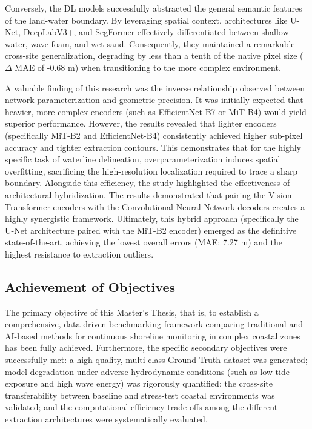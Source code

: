 ﻿\documentclass[ENG]{TFUOC}%
\begin{document}
Conversely, the DL models successfully abstracted the general semantic features of the land-water boundary. By leveraging spatial context, architectures like U-Net, DeepLabV3+, and SegFormer effectively differentiated between shallow water, wave foam, and wet sand. Consequently, they maintained a remarkable cross-site generalization, degrading by less than a tenth of the native pixel size ($\Delta$ MAE of -0.68 m) when transitioning to the more complex environment. 

A valuable finding of this research was the inverse relationship observed between network parameterization and geometric precision. It was initially expected that heavier, more complex encoders (such as EfficientNet-B7 or MiT-B4) would yield superior performance. However, the results revealed that lighter encoders (specifically MiT-B2 and EfficientNet-B4) consistently achieved higher sub-pixel accuracy and tighter extraction contours. This demonstrates that for the highly specific task of waterline delineation, overparameterization induces spatial overfitting, sacrificing the high-resolution localization required to trace a sharp boundary. Alongside this efficiency, the study highlighted the effectiveness of architectural hybridization. The results demonstrated that pairing the Vision Transformer encoders with the Convolutional Neural Network decoders creates a highly synergistic framework. Ultimately, this hybrid approach (specifically the U-Net architecture paired with the MiT-B2 encoder) emerged as the definitive state-of-the-art, achieving the lowest overall errors (MAE: 7.27 m) and the highest resistance to extraction outliers.

\subsection{Achievement of Objectives}
The primary objective of this Master's Thesis, that is, to establish a comprehensive, data-driven benchmarking framework comparing traditional and AI-based methods for continuous shoreline monitoring in complex coastal zones has been fully achieved. Furthermore, the specific secondary objectives were successfully met: a high-quality, multi-class Ground Truth dataset was generated; model degradation under adverse hydrodynamic conditions (such as low-tide exposure and high wave energy) was rigorously quantified; the cross-site transferability between baseline and stress-test coastal environments was validated; and the computational efficiency trade-offs among the different extraction architectures were systematically evaluated.
\end{document}
